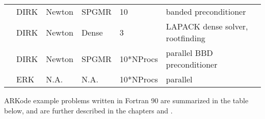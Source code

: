 \documentclass[letterpaper,10pt,english]{sphinxmanual}
\begin{document}
\begin{savenotes}\sphinxattablestart
\centering
\begin{tabulary}{\linewidth}[t]{|T|T|T|T|T|T|}
\hline
{}\relax &\relax &\relax &\relax &\relax &\relax \\
\hline
{\hyperref[\detokenize{f77_serial:fark-diurnal-kry-bp}]{}}
&
DIRK
&
Newton
&
SPGMR
&
10
&
banded preconditioner
\\
\hline
{\hyperref[\detokenize{f77_serial:fark-roberts-dnsl}]{}}
&
DIRK
&
Newton
&
Dense
&
3
&
LAPACK dense solver, rootfinding
\\
\hline
{\hyperref[\detokenize{f77_parallel:fark-diag-kry-bbd-p}]{}}
&
DIRK
&
Newton
&
SPGMR
&
10*NProcs
&
parallel BBD preconditioner
\\
\hline
{\hyperref[\detokenize{f77_parallel:fark-diag-non-p}]{}}
&
ERK
&
N.A.
&
N.A.
&
10*NProcs
&
parallel
\\
\hline
\end{tabulary}
\par
\sphinxattableend\end{savenotes}

ARKode example problems written in Fortran 90 are summarized in the table
below, and are further described in the chapters {\hyperref[\detokenize{f90_serial:serial-f90}]{}} and
{\hyperref[\detokenize{f90_parallel:parallel-f90}]{}}.
\end{document}
